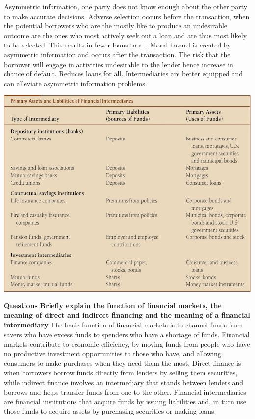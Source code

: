 \documentclass[12pt]{examnotes}
\begin{document}
\ra Asymmetric information, one party does not know enough about the other party to make accurate decisions.
Adverse selection occurs before the transaction, when the potential borrowers who are the mostly like to produce an undesirable outcome are the ones who most actively seek out a loan and are thus most likely to be selected. This results in fewer loans to all.
Moral hazard is created by asymmetric information and occurs after the transaction. The risk that the borrower will engage in activities undesirable to the lender hence increase in chance of default. Reduces loans for all.
Intermediaries are better equipped and can alleviate asymmetric information problems. 

\includegraphics[scale=0.4]{./imgs/2types.jpg}



\textbf{Questions}
\textbf{Briefly explain the function of financial markets, the meaning of direct and indirect financing and the meaning of a financial intermediary}
The basic function of financial markets is to channel funds from savers who have excess funds to spenders who have a shortage of funds. Financial markets contribute to economic efficiency, by moving funds from people who have no productive investment opportunities to those who have, and allowing consumers to make purchases when they need them the most. Direct finance is when borrowers borrow funds directly from lenders by selling them securities, while indirect finance involves an intermediary that stands between lenders and borrows and helps transfer funds from one to the other. Financial intermediaries are financial institutions that acquire funds by issuing liabilities and, in turn use those funds to acquire assets by purchasing securities or making loans.
\end{document}

